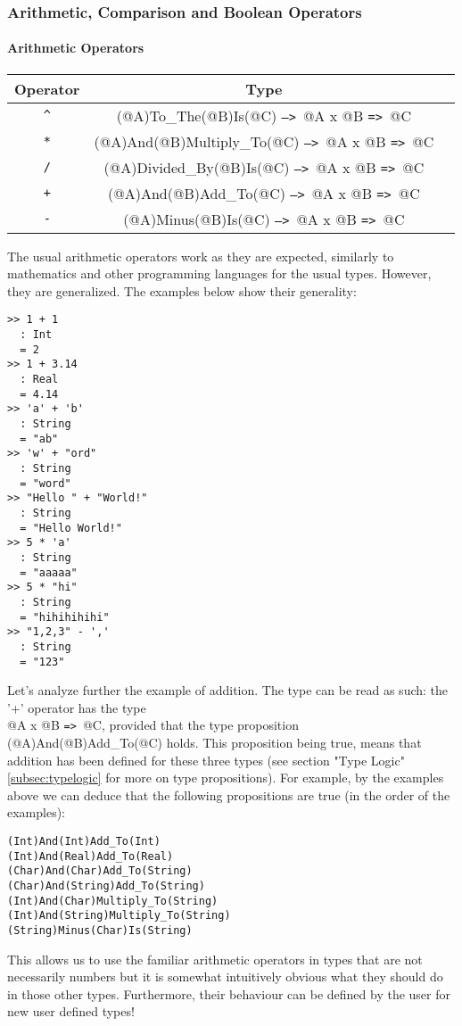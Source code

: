 \documentclass{article}
\def\ra{\texttt{=>}\ }
\def\Ra{\texttt{-->}\ }
\begin{document}
\newpage

\subsubsection{Arithmetic, Comparison and Boolean Operators}

\paragraph{Arithmetic Operators}
\begin{center}
\begin{tabular}{ |c|c|c| } 
\hline
Operator & Type
\\ 
\hline
\hline
\texttt{\^} & (@A)To_The(@B)Is(@C) \Ra @A x @B \ra @C
\\
\hline
\texttt{*} & (@A)And(@B)Multiply_To(@C) \Ra @A x @B \ra @C
\\
\hline
\texttt{/} & (@A)Divided_By(@B)Is(@C) \Ra @A x @B \ra @C
\\
\hline
\texttt{+} & (@A)And(@B)Add_To(@C) \Ra @A x @B \ra @C
\\ 
\hline
\texttt{-} & (@A)Minus(@B)Is(@C) \Ra @A x @B \ra @C
\\
\hline
\end{tabular}
\end{center}
The usual arithmetic operators work as they are expected, similarly to
mathematics and other programming languages for the usual types. However, they
are generalized. The examples below show their generality:
\begin{verbatim}
>> 1 + 1
  : Int
  = 2
>> 1 + 3.14
  : Real
  = 4.14
>> 'a' + 'b'
  : String
  = "ab"
>> 'w' + "ord"
  : String
  = "word"
>> "Hello " + "World!"
  : String
  = "Hello World!"
>> 5 * 'a'
  : String
  = "aaaaa"
>> 5 * "hi"
  : String
  = "hihihihihi"
>> "1,2,3" - ','
  : String
  = "123"
\end{verbatim}
Let's analyze further the example of addition. The type can be read as such:
the '+' operator has the type \\ @A x @B \ra @C, provided that the type
proposition (@A)And(@B)Add_To(@C) holds. This proposition being true, means
that addition has been defined for these three types (see section "Type Logic"
\ref{subsec:typelogic} for more on type propositions). For example, by the
examples above we can deduce that the following propositions are true (in the
order of the examples):
\begin{verbatim}
(Int)And(Int)Add_To(Int)
(Int)And(Real)Add_To(Real)
(Char)And(Char)Add_To(String)
(Char)And(String)Add_To(String)
(Int)And(Char)Multiply_To(String)
(Int)And(String)Multiply_To(String)
(String)Minus(Char)Is(String)
\end{verbatim}
This allows us to use the familiar arithmetic operators in types that are not
necessarily numbers but it is somewhat intuitively obvious what they should do
in those other types. Furthermore, their behaviour can be defined by the user
for new user defined types!
\end{document}
